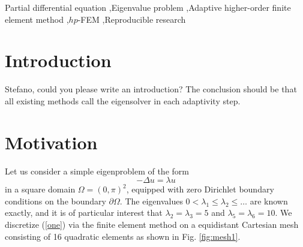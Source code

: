 \documentclass[preprint ,12pt]{elsarticle}
\begin{document}
\begin{frontmatter}
\begin{keyword}
Partial differential equation \sep Eigenvalue problem \sep Adaptive higher-order finite element
method \sep $hp$-FEM \sep Reproducible research
\end{keyword}

\end{frontmatter}




\section{Introduction}

{\red Stefano, could you please write an introduction? The
conclusion should be that all existing methods call the eigensolver in each adaptivity step.}

\section{Motivation}

Let us consider a simple eigenproblem of the form 
\begin{equation} \label{one}
-\Delta u = \lambda u
\end{equation}
in a square domain $\Omega = (0, \pi)^2$, equipped with zero Dirichlet boundary conditions 
on the boundary $\partial \Omega$. The eigenvalues $0 < \lambda_1 \le \lambda_2 \le \ldots$ 
are known exactly, and it is of particular interest that $\lambda_2 = \lambda_3 = 5$ and 
$\lambda_5 = \lambda_6 = 10$. We discretize (\ref{one}) via the finite element method
on a equidistant Cartesian mesh consisting of 16 quadratic elements as shown in Fig. \ref{fig:mesh1}.
\end{document}
